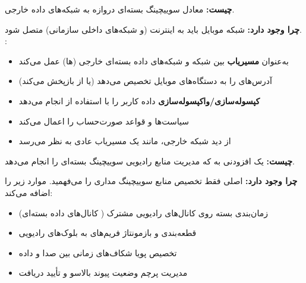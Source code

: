 
\textbf{چیست:} معادل سوییچینگ بسته‌ای   دروازه به شبکه‌های داده خارجی.

\textbf{چرا وجود دارد:} شبکه موبایل باید به اینترنت (و شبکه‌های داخلی سازمانی) متصل شود. :

\begin{itemize}
\tightlist
\item
  به‌عنوان \textbf{مسیریاب } بین شبکه  و شبکه‌های داده بسته‌ای خارجی (ها) عمل می‌کند
\item
  آدرس‌های  را به دستگاه‌های موبایل تخصیص می‌دهد (یا از  بازپخش می‌کند)
\item
  \textbf{کپسوله‌سازی/\allowbreak{}واکپسوله‌سازی} داده کاربر را با استفاده از  انجام می‌دهد
\item
  سیاست‌ها و قواعد صورت‌حساب را اعمال می‌کند
\item
  از دید شبکه خارجی،  مانند یک مسیریاب  عادی به نظر می‌رسد
\end{itemize}


\textbf{چیست:} یک افزودنی به  که مدیریت منابع رادیویی سوییچینگ بسته‌ای را انجام می‌دهد.

\textbf{چرا وجود دارد:}  اصلی فقط تخصیص منابع سوییچینگ مداری را می‌فهمید.  موارد زیر را اضافه می‌کند:

\begin{itemize}
\tightlist
\item
  زمان‌بندی بسته روی کانال‌های رادیویی مشترک (  کانال‌های داده بسته‌ای)
\item
  قطعه‌بندی و بازمونتاژ فریم‌های  به بلوک‌های رادیویی
\item
  تخصیص پویا شکاف‌های زمانی بین صدا  و داده 
\item
  مدیریت پرچم وضعیت پیوند بالاسو و تأیید دریافت
\end{itemize}




